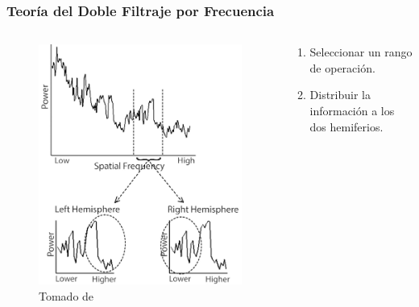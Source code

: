 \documentclass[
11pt, %
%
aspectratio=169, %
]{beamer}
\begin{document}
	\begin{frame}
		\frametitle{Teor\'ia del Doble Filtraje por Frecuencia}
		
		\begin{columns}[t] %
		
			\begin{column}{0.3\textwidth} %
			\begin{figure}
				\captionsetup{font=tiny}
				\includegraphics[scale=0.25]{Graphics/dff}
				\caption{Tomado de \cite{flevaris_spatial_2016}}
			\end{figure} 	
				
				
			\end{column}
		
		\begin{column}{0.4\textwidth} %
			\begin{enumerate}
				\item Seleccionar un rango de operación.
				\item Distribuir la información a los dos hemiferios.
			\end{enumerate}	
			
		\end{column}
		\end{columns}	
		
		
	\end{frame}
\end{document}
